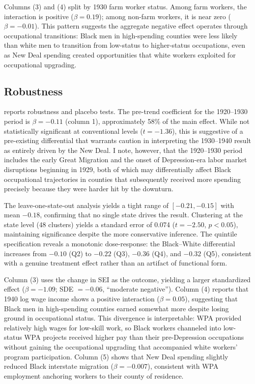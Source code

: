 \documentclass[12pt]{article}
\begin{document}
Columns (3) and (4) split by 1930 farm worker status. Among farm workers, the interaction is positive ($\beta = 0.19$); among non-farm workers, it is near zero ($\beta = -0.01$). This pattern suggests the aggregate negative effect operates through occupational transitions: Black men in high-spending counties were less likely than white men to transition from low-status to higher-status occupations, even as New Deal spending created opportunities that white workers exploited for occupational upgrading.

\subsection{Robustness}



 reports robustness and placebo tests. The pre-trend coefficient for the 1920--1930 period is $\beta = -0.11$ (column 1), approximately 58\% of the main effect. While not statistically significant at conventional levels ($t = -1.36$), this is suggestive of a pre-existing differential that warrants caution in interpreting the 1930--1940 result as entirely driven by the New Deal. I note, however, that the 1920--1930 period includes the early Great Migration and the onset of Depression-era labor market disruptions beginning in 1929, both of which may differentially affect Black occupational trajectories in counties that subsequently received more spending precisely because they were harder hit by the downturn.

The leave-one-state-out analysis yields a tight range of $[-0.21, -0.15]$ with mean $-0.18$, confirming that no single state drives the result. Clustering at the state level (48 clusters) yields a standard error of 0.074 ($t = -2.50$, $p < 0.05$), maintaining significance despite the more conservative inference. The quintile specification reveals a monotonic dose-response: the Black--White differential increases from $-0.10$ (Q2) to $-0.22$ (Q3), $-0.36$ (Q4), and $-0.32$ (Q5), consistent with a genuine treatment effect rather than an artifact of functional form.

Column (3) uses the change in SEI as the outcome, yielding a larger standardized effect ($\beta = -1.09$; SDE $= -0.06$, ``moderate negative''). Column (4) reports that 1940 log wage income shows a positive interaction ($\beta = 0.05$), suggesting that Black men in high-spending counties earned somewhat more despite losing ground in occupational status. This divergence is interpretable: WPA provided relatively high wages for low-skill work, so Black workers channeled into low-status WPA projects received higher pay than their pre-Depression occupations without gaining the occupational upgrading that accompanied white workers' program participation. Column (5) shows that New Deal spending slightly reduced Black interstate migration ($\beta = -0.007$), consistent with WPA employment anchoring workers to their county of residence.
\end{document}
